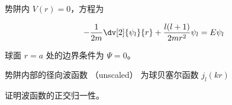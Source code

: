 
\begin{issues}
\issueDraft
\end{issues}


势阱内 $V(r) = 0$，方程为

\begin{equation}
-\frac{1}{2m} \dv[2]{\psi_l}{r} + \frac{l(l + 1)}{2mr^2}\psi_l = E\psi_l
\end{equation}

球面 $r = a$ 处的边界条件为 $\Psi = 0$。

势阱内部的径向波函数 （unscaled） 为球贝塞尔函数 $j_l(kr)$

证明波函数的正交归一性。
